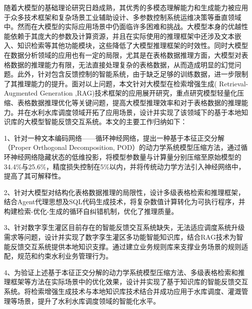 \begin{cabstract}
    随着大模型的基础理论研究日趋成熟，其优秀的多模态理解能力和生成能力被应用于众多技术框架和复杂场景工业辅助设计、多参数控制系统运维决策等垂直领域中。然而在大模型的实际应用场景中仍面临许多困难和挑战。大模型本身的优越性能依赖于其庞大的参数及计算资源，并且在实际使用的推理框架中还涉及文本嵌入、知识检索等其他功能模块，这些降低了大模型推理框架的时效性。同时大模型在数据分析领域的应用也有一定的局限，尤其是在表格数据推理方面，大模型对表格数据的推理能力有限，无法直接处理复杂的表格数据，从而造成明显的幻觉问题。此外，针对包含反馈控制的智能系统，由于缺乏足够的训练数据，进一步限制了其推理能力的提升。面对以上问题，本文针对大模型在检索增强生成( Retrieval-Augmented Generation ,RAG)技术框架的应用展开研究，重点研究模型轻量化压缩、表格数据推理优化等关键问题，提高大模型推理效率和对于表格数据的推理能力。并在水利水库调度领域开拓了应用场景，设计并实现了该领域下的基于本地知识库的大模型智能反馈交互系统。本文的主要工作归纳如下： 

    1、针对一种文本编码网络——循环神经网络，提出一种基于本征正交分解（Proper Orthogonal Decomposition, POD）的动力学系统模型压缩方法，通过循环神经网络隐藏状态的低维投影，将模型参数量与计算量分别压缩至原始模型的34.4\%与25.6\%，精度损失控制在5\%以内，并将传统动力学方法引入神经网络中，提高了其可解释性。
    
    2、针对大模型对结构化表格数据推理的局限性，设计多级表格检索和推理框架，结合Agent代理思想及SQL代码生成技术，将复杂数值计算转化为可执行程序，并构建检索-优化-生成的循环自纠错机制，优化了推理质量。
    
    3、针对数字孪生灌区目前存在的智能反馈交互系统缺失，无法适应调度系统升级需求等问题，设计并实现了数字孪生灌区多功能智能知识库，结合RAG技术为智能反馈交互系统提供本地知识支撑。通过建立业务规则库来支撑业务场景的规则适配，规范和约束水利业务管理行为。

    4、为验证上述基于本征正交分解的动力学系统模型压缩方法、多级表格检索和推理框架等方法在实际场景中的优化效果，设计并实现了基于知识库的智能反馈交互系统。将检索增强生成技术与本地知识库技术结合并成功应用于水库调度、灌溉管理等场景，提升了水利水库调度领域的智能化水平。
    \end{cabstract}
    
    
